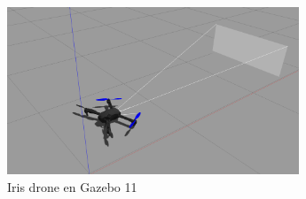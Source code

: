 \begin{figure} [H]
	\begin{center}
	\includegraphics[height=5cm]{imagenes/cap3/8_iris_drone.png}
	\end{center}
	\caption[Iris drone en Gazebo 11]{Iris drone en Gazebo 11}
	\label{fig:irisdrone}
\end{figure}